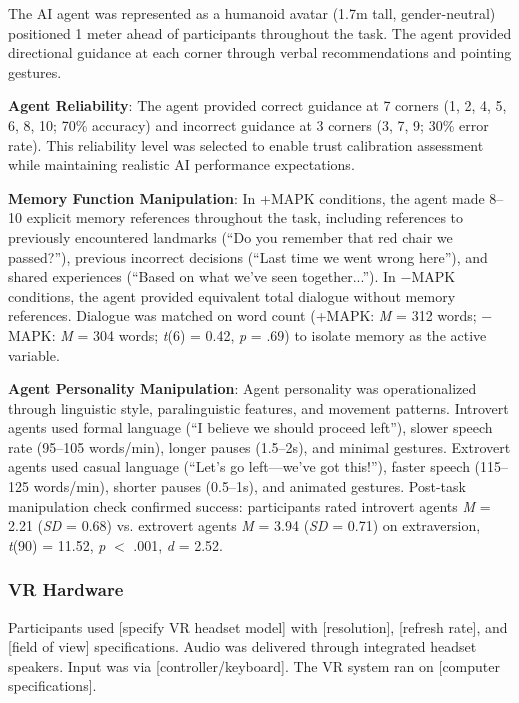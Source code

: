 \documentclass[12pt]{article}
\begin{document}
The AI agent was represented as a humanoid avatar (1.7m tall, gender-neutral) positioned 1 meter ahead of participants throughout the task. The agent provided directional guidance at each corner through verbal recommendations and pointing gestures.

\textbf{Agent Reliability}: The agent provided correct guidance at 7 corners (1, 2, 4, 5, 6, 8, 10; 70\% accuracy) and incorrect guidance at 3 corners (3, 7, 9; 30\% error rate). This reliability level was selected to enable trust calibration assessment while maintaining realistic AI performance expectations.

\textbf{Memory Function Manipulation}: In +MAPK conditions, the agent made 8--10 explicit memory references throughout the task, including references to previously encountered landmarks (``Do you remember that red chair we passed?''), previous incorrect decisions (``Last time we went wrong here''), and shared experiences (``Based on what we've seen together...''). In $-$MAPK conditions, the agent provided equivalent total dialogue without memory references. Dialogue was matched on word count (+MAPK: \textit{M} = 312 words; $-$MAPK: \textit{M} = 304 words; \textit{t}(6) = 0.42, \textit{p} = .69) to isolate memory as the active variable.

\textbf{Agent Personality Manipulation}: Agent personality was operationalized through linguistic style, paralinguistic features, and movement patterns. Introvert agents used formal language (``I believe we should proceed left''), slower speech rate (95--105 words/min), longer pauses (1.5--2s), and minimal gestures. Extrovert agents used casual language (``Let's go left---we've got this!''), faster speech (115--125 words/min), shorter pauses (0.5--1s), and animated gestures. Post-task manipulation check confirmed success: participants rated introvert agents \textit{M} = 2.21 (\textit{SD} = 0.68) vs. extrovert agents \textit{M} = 3.94 (\textit{SD} = 0.71) on extraversion, \textit{t}(90) = 11.52, \textit{p} $<$ .001, \textit{d} = 2.52.

\subsubsection{VR Hardware}

Participants used [specify VR headset model] with [resolution], [refresh rate], and [field of view] specifications. Audio was delivered through integrated headset speakers. Input was via [controller/keyboard]. The VR system ran on [computer specifications].
\end{document}
